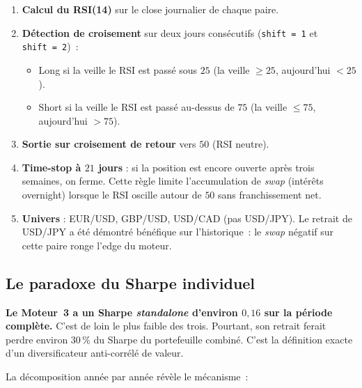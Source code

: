 \documentclass[11pt, a4paper]{scrartcl}
\begin{document}
\begin{enumerate}
\item \textbf{Calcul du RSI(14)} sur le close journalier de chaque paire.
\item \textbf{Détection de croisement} sur deux jours consécutifs (\texttt{shift~=~1} et \texttt{shift~=~2})~:
  \begin{itemize}
  \item Long si la veille le RSI est passé sous $25$ (la veille $\geq 25$, aujourd'hui $< 25$).
  \item Short si la veille le RSI est passé au-dessus de $75$ (la veille $\leq 75$, aujourd'hui $> 75$).
  \end{itemize}
\item \textbf{Sortie sur croisement de retour} vers $50$ (RSI neutre).
\item \textbf{Time-stop à $21$ jours} : si la position est encore ouverte après trois semaines, on ferme. Cette règle limite l'accumulation de \emph{swap} (intérêts overnight) lorsque le RSI oscille autour de $50$ sans franchissement net.
\item \textbf{Univers} : EUR/USD, GBP/USD, USD/CAD (pas USD/JPY). Le retrait de USD/JPY a été démontré bénéfique sur l'historique~: le \emph{swap} négatif sur cette paire ronge l'edge du moteur.
\end{enumerate}

\subsection{Le paradoxe du Sharpe individuel}

\begin{warningbox}
\textbf{Le Moteur~3 a un Sharpe \emph{standalone} d'environ $0{,}16$ sur la période
complète.} C'est de loin le plus faible des trois. Pourtant, son retrait ferait
perdre environ $30\,\%$ du Sharpe du portefeuille combiné. C'est la définition
exacte d'un diversificateur anti-corrélé de valeur.
\end{warningbox}

La décomposition année par année révèle le mécanisme~:
\end{document}
